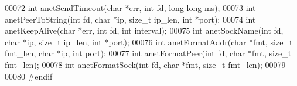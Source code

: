 \begin{DoxyCode}
00072 \textcolor{keywordtype}{int} anetSendTimeout(\textcolor{keywordtype}{char} *err, \textcolor{keywordtype}{int} fd, \textcolor{keywordtype}{long} \textcolor{keywordtype}{long} ms);
00073 \textcolor{keywordtype}{int} anetPeerToString(\textcolor{keywordtype}{int} fd, \textcolor{keywordtype}{char} *ip, size\_t ip\_len, \textcolor{keywordtype}{int} *port);
00074 \textcolor{keywordtype}{int} anetKeepAlive(\textcolor{keywordtype}{char} *err, \textcolor{keywordtype}{int} fd, \textcolor{keywordtype}{int} interval);
00075 \textcolor{keywordtype}{int} anetSockName(\textcolor{keywordtype}{int} fd, \textcolor{keywordtype}{char} *ip, size\_t ip\_len, \textcolor{keywordtype}{int} *port);
00076 \textcolor{keywordtype}{int} anetFormatAddr(\textcolor{keywordtype}{char} *fmt, size\_t fmt\_len, \textcolor{keywordtype}{char} *ip, \textcolor{keywordtype}{int} port);
00077 \textcolor{keywordtype}{int} anetFormatPeer(\textcolor{keywordtype}{int} fd, \textcolor{keywordtype}{char} *fmt, size\_t fmt\_len);
00078 \textcolor{keywordtype}{int} anetFormatSock(\textcolor{keywordtype}{int} fd, \textcolor{keywordtype}{char} *fmt, size\_t fmt\_len);
00079 
00080 \textcolor{preprocessor}{#}\textcolor{preprocessor}{endif}
\end{DoxyCode}
